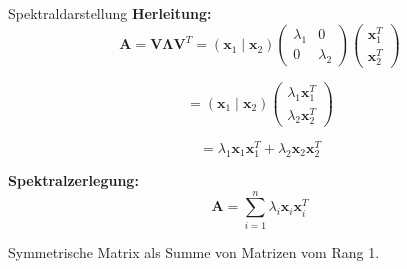 \documentclass[a4paper, fontsize=7pt]{scrartcl}
\begin{document}
\begin{mainbox}{Spektraldarstellung}
\textbf{Herleitung:}
$$\mathbf{A} = \mathbf{V\Lambda V}^T = (\mathbf{x}_1 \mid \mathbf{x}_2)\begin{pmatrix} \lambda_1 & 0 \\ 0 & \lambda_2 \end{pmatrix}\begin{pmatrix} \mathbf{x}_1^T \\ \mathbf{x}_2^T \end{pmatrix}$$

$$= (\mathbf{x}_1 \mid \mathbf{x}_2)\begin{pmatrix} \lambda_1\mathbf{x}_1^T \\ \lambda_2\mathbf{x}_2^T \end{pmatrix}$$

$$= \lambda_1\mathbf{x}_1\mathbf{x}_1^T + \lambda_2\mathbf{x}_2\mathbf{x}_2^T$$

\textbf{Spektralzerlegung:}
$$\mathbf{A} = \sum_{i=1}^{n} \lambda_i\mathbf{x}_i\mathbf{x}_i^T$$

Symmetrische Matrix als Summe von Matrizen vom Rang 1.
\end{mainbox}
\end{document}
